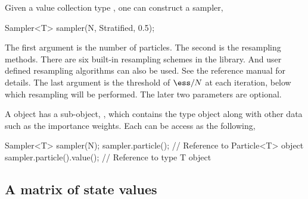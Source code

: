 Given a value collection type , one can construct a sampler,
\begin{cppcode}
Sampler<T> sampler(N, Stratified, 0.5);
\end{cppcode}
The first argument is the number of particles. The second is the resampling
methods. There are six built-in resampling schemes in the library. And user
defined resampling algorithms can also be used. See the reference manual for
details. The last argument is the threshold of $\ess/N$ at each iteration,
below which resampling will be performed. The later two parameters are
optional.

A  object has a sub-object, ,
which contains the type  object along with other data such as
the importance weights. Each can be access as the following,
\begin{cppcode}
Sampler<T> sampler(N);
sampler.particle();         // Reference to Particle<T> object
sampler.particle().value(); // Reference to type T object
\end{cppcode}

\subsection{A matrix of state values}
\label{sub:A matrix of state values}

